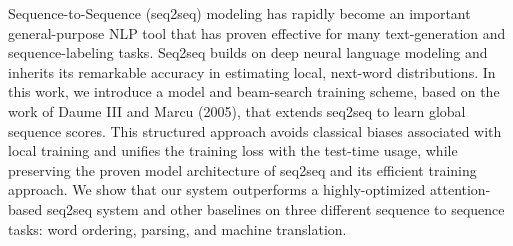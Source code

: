 Sequence-to-Sequence (seq2seq) modeling has rapidly become an important general-purpose NLP tool that has proven effective for many text-generation and sequence-labeling tasks. Seq2seq builds on deep neural language modeling and inherits its remarkable accuracy in estimating local, next-word distributions. In this work, we introduce a model and beam-search training scheme, based on the work of Daume III and Marcu (2005), that extends seq2seq to learn global sequence scores. This structured approach avoids classical biases associated with local training and unifies the training loss with the test-time usage, while preserving the proven model architecture of seq2seq and its efficient training approach. We show that our system outperforms a highly-optimized attention-based seq2seq system and other baselines on three different sequence to sequence tasks: word ordering, parsing, and machine translation.
